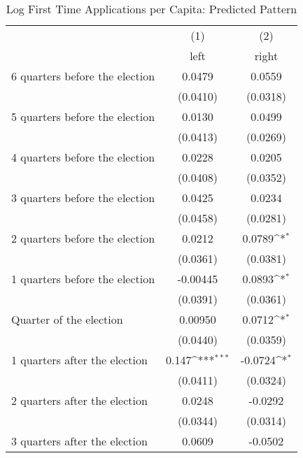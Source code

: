 \begin{table}[htbp]\centering
\def\sym#1{\ifmmode^{#1}\else\(^{#1}\)\fi}
\caption{Log First Time Applications per Capita: Predicted Pattern}
\begin{tabular}{l*{2}{c}}
\hline\hline
                    &\multicolumn{1}{c}{(1)}&\multicolumn{1}{c}{(2)}\\
                    &\multicolumn{1}{c}{left}&\multicolumn{1}{c}{right}\\
\hline
 6 quarters before the election&      0.0479         &      0.0559         \\
                    &    (0.0410)         &    (0.0318)         \\
[1em]
 5 quarters before the election&      0.0130         &      0.0499         \\
                    &    (0.0413)         &    (0.0269)         \\
[1em]
 4 quarters before the election&      0.0228         &      0.0205         \\
                    &    (0.0408)         &    (0.0352)         \\
[1em]
 3 quarters before the election&      0.0425         &      0.0234         \\
                    &    (0.0458)         &    (0.0281)         \\
[1em]
 2 quarters before the election&      0.0212         &      0.0789\sym{*}  \\
                    &    (0.0361)         &    (0.0381)         \\
[1em]
 1 quarters before the election&    -0.00445         &      0.0893\sym{*}  \\
                    &    (0.0391)         &    (0.0361)         \\
[1em]
Quarter of the election&     0.00950         &      0.0712\sym{*}  \\
                    &    (0.0440)         &    (0.0359)         \\
[1em]
 1 quarters after the election&       0.147\sym{***}&     -0.0724\sym{*}  \\
                    &    (0.0411)         &    (0.0324)         \\
[1em]
 2 quarters after the election&      0.0248         &     -0.0292         \\
                    &    (0.0344)         &    (0.0314)         \\
[1em]
 3 quarters after the election&      0.0609         &     -0.0502         \\

\end{tabular}
\end{table}

